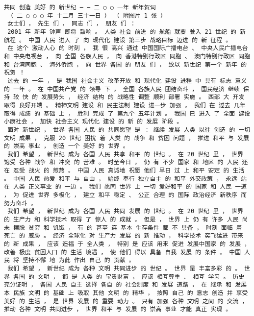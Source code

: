 \documentclass{article}
\begin{document}
    \begin{Verbatim}[commandchars=\\\{\}]
共同 创造 美好 的 新世纪 — — 二 ○ ○ 一年 新年贺词 
 （ 二 ○ ○ ○ 年 十二月 三十一日 ） （ 附图片 1 张 ） 
 女士们 ， 先生 们 ， 同志 们 ， 朋友 们 ： 
 2001 年 新年 钟声 即将 敲响 。 人类 社会 前进 的 航船 就要 驶入 21 世纪 的 新 航程 。 中国 人民 进入 了 向 现代化 建设 第三步 战略目标 迈进 的 新 征程 。 
 在 这个 激动人心 的 时刻 ， 我 很 高兴 通过 中国国际广播电台 、 中央人民广播电台 和 中央电视台 ， 向 全国 各族人民 ， 向 香港特别行政区 同胞 、 澳门特别行政区 同胞 和 台湾同胞 、 海外侨胞 ， 向 世界 各国 的 朋友 们 ， 致以 新世纪 第一个 新年 的 祝贺 ！ 
 过去 的 一年 ， 是 我国 社会主义 改革开放 和 现代化 建设 进程 中 具有 标志 意义 的 一年 。 在 中国共产党 的 领导 下 ， 全国 各族人民 团结奋斗 ， 国民经济 继续 保持 较 快 的 发展势头 ， 经济 结构 的 战略性 调整 顺利 部署 实施 。 西部 大 开发 取得 良好开端 。 精神文明 建设 和 民主法制 建设 进一步 加强 。 我们 在 过去 几年 取得 成绩 的 基础 上 ， 胜利 完成 了 第九个 五年计划 。 我国 已 进入 了 全面 建设 小康社会 ， 加快 社会主义 现代化 建设 的 新 的 发展 阶段 。 
 面对 新世纪 ， 世界 各国 人民 的 共同愿望 是 ： 继续 发展 人类 以往 创造 的 一切 文明 成果 ， 克服 20 世纪 困扰 着 人类 的 战争 和 贫困 问题 ， 推进 和平 与 发展 的 崇高 事业 ， 创造 一个 美好 的 世界 。 
 我们 希望 ， 新世纪 成为 各国 人民 共享 和平 的 世纪 。 在 20 世纪 里 ， 世界 饱受 各种 战争 和 冲突 的 苦难 。 时至今日 ， 仍 有 不少 国家 和 地区 的 人民 还 在 忍受 战火 的 煎熬 。 中国 人民 真诚地 祝愿 他们 早日 过 上 和平 安定 的 生活 。 中国 人民 热爱 和平 与 自由 ， 始终 奉行 独立自主 的 和平 外交政策 ， 永远 站 在 人类 正义事业 的 一边 。 我们 愿同 世界 上 一切 爱好和平 的 国家 和 人民 一道 ， 为 促进 世界 多极化 ， 建立 和平 稳定 、 公正 合理 的 国际 政治经济 新秩序 而 努力奋斗 。 
 我们 希望 ， 新世纪 成为 各国 人民 共同 发展 的 世纪 。 在 20 世纪 里 ， 世界 的 生产力 和 科学技术 取得 了 惊人 的 成就 。 但是 ， 世界 上 仍 有 许多 人民 尚未 摆脱 贫穷 和 饥饿 ， 有 的 甚至 连 基本 生存条件 都 不 具备 ， 时刻 面临 着 死亡 的 威胁 。 经济 全球化 对 生产力 发展 的 新 推动 ， 科学技术 突飞猛进 带来 的 新 成果 ， 应该 造福 于 全人类 ， 特别 是 应该 用来 促进 发展中国家 的 发展 ， 改善 极度 贫困人口 的 生活 境遇 ， 使 他们 得以 具备 自我 发展 的 条件 。 中国 人民 将 坚持不懈 地 为此 作出 自己 的 贡献 。 
 我们 希望 ， 新世纪 成为 各种 文明 共同进步 的 世纪 。 世界 是 丰富多彩 的 。 世界 各国 的 文明 ， 都 是 人类 的 宝贵财富 ， 应该 相互尊重 、 相互 学习 。 历史 充分证明 ， 各国 人民 自主 选择 各自 的 社会制度 和 发展 道路 ， 在 继承 和 发展 本 民族 文明 的 基础 上 吸取 其他 文明 的 精华 ， 按照 自己 的 意志 创造 并 享受 美好 的 生活 ， 是 世界 发展 的 重要 动力 。 只有 加强 各种 文明 之间 的 交流 ， 推动 各种 文明 共同进步 ， 世界 和平 与 发展 的 崇高 事业 才能 真正 实现 。 

\end{Verbatim}
\end{document}
